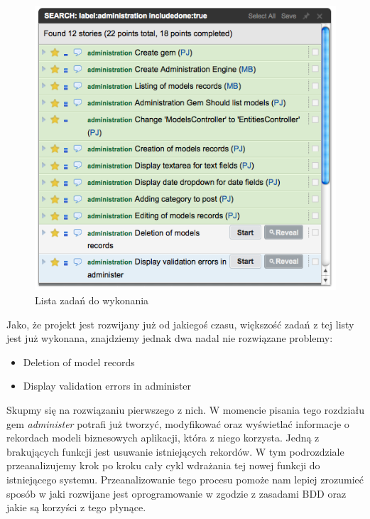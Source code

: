     \begin{figure}
  		\begin{center}
  			\includegraphics[width=\linewidth]{images/administer_stories_list.png}
  			\caption{Lista zadań do wykonania}
  			\label{administer_stories}
  		\end{center}
  	\end{figure}
  	
    Jako, że projekt jest rozwijany już od jakiegoś czasu, większość zadań z tej listy jest już wykonana, znajdziemy jednak dwa nadal nie rozwiązane problemy:
    
    \begin{itemize}
      \item Deletion of model records
      \item Display validation errors in administer
    \end{itemize}
    
    Skupmy się na rozwiązaniu pierwszego z nich. W momencie pisania tego rozdziału gem \emph{administer} potrafi już tworzyć, modyfikować oraz wyświetlać informacje o rekordach modeli biznesowych aplikacji, która z niego korzysta. Jedną z brakujących funkcji jest usuwanie istniejących rekordów. W tym podrozdziale przeanalizujemy krok po kroku cały cykl wdrażania tej nowej funkcji do istniejącego systemu. Przeanalizowanie tego procesu pomoże nam lepiej zrozumieć sposób w jaki rozwijane jest oprogramowanie w zgodzie z zasadami BDD oraz jakie są korzyści z tego płynące.
    

